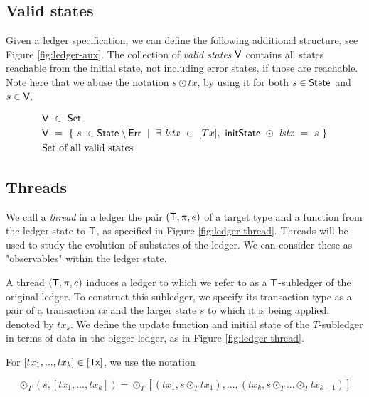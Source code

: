 \subsection{Valid states}
\label{sec:valid}

Given a ledger specification, we can define the following additional structure,
see Figure \ref{fig:ledger-aux}. The collection of \emph{valid states} $\mathsf{V}$
contains all states reachable from the initial state,
not including error states, if those are reachable. Note here that we abuse the
notation $s \odot tx$, by using it for both $s \in \mathsf{State}$ and $s \in \mathsf{V}$.


\begin{figure*}[htb]
   \begin{align*}
      & \mathsf{V} ~\in~ \mathsf{Set} \\
      & \mathsf{V} ~=~
          \{ ~s~\in \mathsf{State} \setminus \mathsf{Err}~ \mid ~\exists~\mathit{lstx}~\in~[Tx],~\mathsf{initState}~\odot~\mathit{lstx}~=~s~\} \\
      & \text{Set of all valid states} \\
    \end{align*}
  \caption{Ledger specification additional structure}
  \label{fig:ledger-aux}
\end{figure*}

\pagebreak

\subsection{Threads}
\label{sec:threads}

We call a \emph{thread} in a ledger the pair $(\mathsf{T}, \pi, e)$ of a target type and a function
from the ledger state to $\mathsf{T}$, as specified in Figure \ref{fig:ledger-thread}.
Threads will be used to study the evolution of substates
of the ledger. We can consider these as "observables" within the ledger state.

A thread $(\mathsf{T}, \pi, e)$ induces a ledger to which we refer
to as a $\mathsf{T}$-subledger of the original ledger. To construct
this subledger, we specify its transaction type as a pair of a transaction $tx$
and the larger state $s$
to which it is being applied, denoted by $tx_s$. We define the
update function and initial state of the $T$-subledger in terms of data in the
bigger ledger, as in Figure \ref{fig:ledger-thread}.

For $[tx_1, ..., tx_k] \in [\mathsf{Tx}]$, we use the notation

\[ \odot_T (s, [tx_1, ..., tx_k]) = \odot_T [(tx_1, s \odot_T tx_1), ..., (tx_k, s \odot_T ... \odot_T tx_{k-1})] \]

